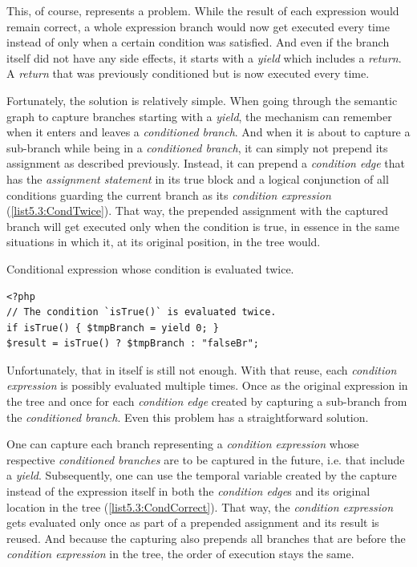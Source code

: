 This, of course, represents a problem. While the result of each expression would remain correct, a whole expression branch would now get executed every time instead of only when a certain condition was satisfied. And even if the branch itself did not have any side effects, it starts with a \emph{yield} which includes a \emph{return}. A \emph{return} that was previously conditioned but is now executed every time.

Fortunately, the solution is relatively simple. When going through the semantic graph to capture branches starting with a \emph{yield}, the mechanism can remember when it enters and leaves a \emph{conditioned branch}. And when it is about to capture a sub-branch while being in a \emph{conditioned branch}, it can simply not prepend its assignment as described previously. Instead, it can prepend a \emph{condition edge} that has the \emph{assignment statement} in its true block and a logical conjunction of all conditions guarding the current branch as its \emph{condition expression} (\autoref{list5.3:CondTwice}). That way, the prepended assignment with the captured branch will get executed only when the condition is true, in essence in the same situations in which it, at its original position, in the tree would.

\begin{listing}[H]
\caption{Conditional expression whose condition is evaluated twice.}
\label{list5.3:CondTwice}
\begin{verbatim}
<?php
// The condition `isTrue()` is evaluated twice.
if isTrue() { $tmpBranch = yield 0; }
$result = isTrue() ? $tmpBranch : "falseBr";
\end{verbatim}
\end{listing}

Unfortunately, that in itself is still not enough. With that reuse, each \emph{condition expression} is possibly evaluated multiple times. Once as the original expression in the tree and once for each \emph{condition edge} created by capturing a sub-branch from the \emph{conditioned branch}. Even this problem has a straightforward solution.

One can capture each branch representing a \emph{condition expression} whose respective \emph{conditioned branches} are to be captured in the future, i.e. that include a \emph{yield}. Subsequently, one can use the temporal variable created by the capture instead of the expression itself in both the \emph{condition edge}s and its original location in the tree (\autoref{list5.3:CondCorrect}). That way, the \emph{condition expression} gets evaluated only once as part of a prepended assignment and its result is reused. And because the capturing also prepends all branches that are before the \emph{condition expression} in the tree, the order of execution stays the same. 

